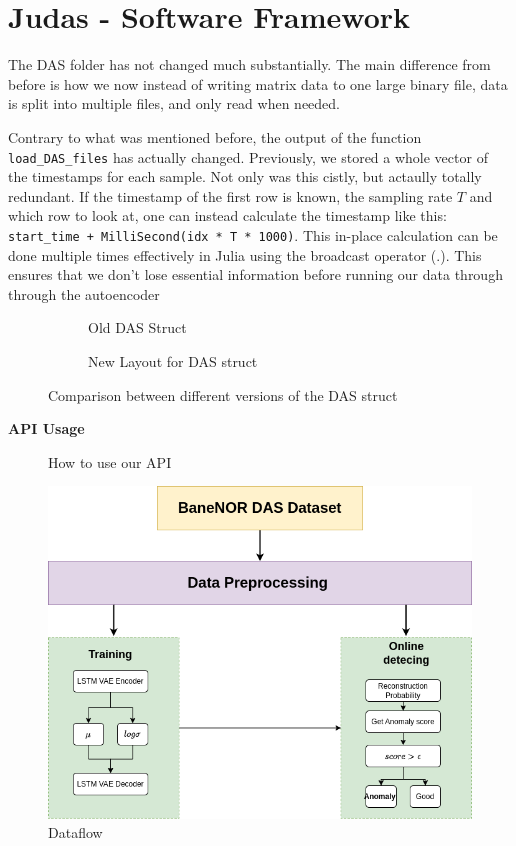 \section{Judas - Software Framework}

The DAS folder has not changed much substantially. The main difference from before is how we now instead of writing matrix data to one large binary file, data is split into multiple files, and only read when needed.

Contrary to what was mentioned before, the output of the function \texttt{load\_DAS\_files} has actually changed. Previously, we stored a whole vector of the timestamps for each sample. Not only was this cistly, but actaully totally redundant. If the timestamp of the first row is known, the sampling rate $T$ and which row to look at, one can instead calculate the timestamp like this: 
\lstinline|start_time + MilliSecond(idx * T * 1000)|. This in-place calculation can be done multiple times effectively in Julia using the broadcast operator (.). This ensures that we don't lose essential information before running our data through through the autoencoder

\begin{figure}[h]
\centering
\begin{subfigure}{.5\textwidth}
  \centering
  
  \caption{Old DAS Struct}
  \label{fig:olddasstc}
\end{subfigure}%
\begin{subfigure}{.5\textwidth}
  \centering
  
  \caption{New Layout for DAS struct}
  \label{fig:newdasstc}
\end{subfigure}
\caption{Comparison between different versions of the DAS struct}
\label{fig:dasstccmp}
\end{figure}




\textbf{API Usage}

\begin{figure}[h]
    \centering
    
    \caption{How to use our API}
    \label{fig:apiusage}
\end{figure}


\begin{figure}[h]
    \centering
    \includegraphics[scale=0.5]{figures/methodflow.png}
    \caption{Dataflow}
    \label{fig:dataflow}
\end{figure}


